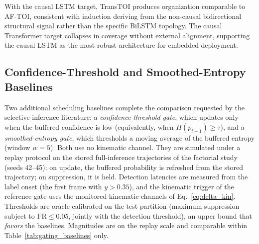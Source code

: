 \documentclass[a4paper,fleqn]{cas-dc}
\newcommand{\AFTOI}{\mbox{AF-TOI}\xspace}
\begin{document}
With the causal LSTM target, TransTOI produces organization comparable to
\AFTOI, consistent with induction deriving from the non-causal bidirectional
structural signal rather than the specific BiLSTM topology. The causal
Transformer target collapses in coverage without external alignment, supporting
the causal LSTM as the most robust architecture for embedded deployment.

{\color{\revcolor}
\subsection{Confidence-Threshold and Smoothed-Entropy Baselines}
\label{sec:gating_baselines}
Two additional scheduling baselines complete the comparison requested by the
selective-inference literature: a \emph{confidence-threshold gate}, which
updates only when the buffered confidence is low (equivalently, when
$H(p_{t-1}) \ge \tau$), and a \emph{smoothed-entropy gate}, which thresholds a
moving average of the buffered entropy (window $w{=}5$). Both use no kinematic
channel. They are simulated under a replay protocol on the stored
full-inference trajectories of the factorial study (seeds 42--45): on update,
the buffered probability is refreshed from the stored trajectory; on
suppression, it is held. Detection latencies are measured from the label
onset (the first frame with $y > 0.35$), and the kinematic trigger of the
reference gate uses the monitored kinematic channels of
Eq.~\ref{eq:delta_kin}. Thresholds are oracle-calibrated on the test
partition (maximum suppression subject to $\mathrm{FR} \le 0.05$, jointly with
the detection threshold), an upper bound that \emph{favors} the baselines.
Magnitudes are on the replay scale and comparable within
Table~\ref{tab:gating_baselines} only.

}
\end{document}
